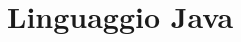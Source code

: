 \documentclass[../main.tex]{subfiles}
\begin{document}
\clearpage
\thispagestyle{empty}
\vspace*{7cm}
\section{Linguaggio Java}
\vspace*{1.5cm}









	
\end{document}
